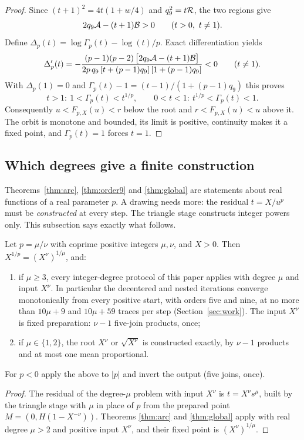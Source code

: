 \begin{proof}
Since $(t+1)^{2}=4t(1+w/4)$ and $q_9^{2}=t\mathcal{R}$, the two regions give
\begin{equation}\label{eq:sign}
2q_9\mathcal{A}-(t+1)\mathcal{B}>0\qquad(t>0,\ t\neq1).
\end{equation}
Define $\Delta_p(t)=\log\Gamma_p(t)-\log(t)/p$. Exact differentiation yields
\begin{equation}\label{eq:Dprime}
\Delta_p'(t)=-\frac{(p-1)(p-2)\,\bigl[2q_9\mathcal{A}-(t+1)\mathcal{B}\bigr]}{2p\,q_9\,[t+(p-1)q_9]\,[1+(p-1)q_9]}<0\qquad(t\neq1).
\end{equation}
With $\Delta_p(1)=0$ and $\Gamma_p(t)-1=(t-1)/(1+(p-1)q_9)$ this proves
\[ t>1:\ 1<\Gamma_p(t)<t^{1/p},\qquad 0<t<1:\ t^{1/p}<\Gamma_p(t)<1 . \]
Consequently $u<F_{p,X}(u)<r$ below the root and $r<F_{p,X}(u)<u$ above it. The orbit is monotone and
bounded, its limit is positive, continuity makes it a fixed point, and $\Gamma_p(t)=1$ forces $t=1$.
\end{proof}

\subsection{Which degrees give a finite construction}\label{sec:degrees}

Theorems~\ref{thm:arc}, \ref{thm:order9} and \ref{thm:global} are statements about real functions of a
real parameter $p$. A drawing needs more: the residual $t=X/u^{p}$ must be \emph{constructed} at every
step. The triangle stage constructs integer powers only. This subsection says exactly what follows.

\begin{proposition}\label{prop:rational}
Let $p=\mu/\nu$ with coprime positive integers $\mu,\nu$, and $X>0$. Then $X^{1/p}=(X^{\nu})^{1/\mu}$,
and:
\begin{enumerate}[label=(\roman*)]
\item if $\mu\ge3$, every integer-degree protocol of this paper applies with degree $\mu$ and input
  $X^{\nu}$. In particular the decentered and nested iterations converge monotonically from every
  positive start, with orders five and nine, at no more than $10\mu+9$ and $10\mu+59$ traces per step
  (Section~\ref{sec:work}). The input $X^{\nu}$ is fixed preparation: $\nu-1$ five-join products, once;
\item if $\mu\in\{1,2\}$, the root $X^{\nu}$ or $\sqrt{X^{\nu}}$ is constructed exactly, by $\nu-1$
  products and at most one mean proportional.
\end{enumerate}
For $p<0$ apply the above to $|p|$ and invert the output (five joins, once).
\end{proposition}
\begin{proof}
The residual of the degree-$\mu$ problem with input $X^{\nu}$ is $t=X^{\nu}s^{\mu}$, built by the
triangle stage with $\mu$ in place of $p$ from the prepared point $M=(0,H(1-X^{-\nu}))$. Theorems
\ref{thm:arc} and \ref{thm:global} apply with real degree $\mu>2$ and positive input $X^{\nu}$, and
their fixed point is $(X^{\nu})^{1/\mu}$.
\end{proof}

